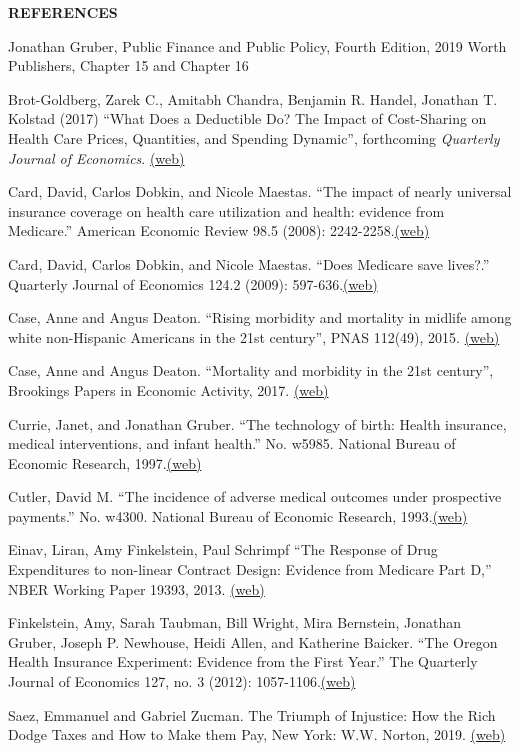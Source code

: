 \documentclass[landscape]{slides}
\begin{document}
\begin{slide}
\begin{center}
{\bf REFERENCES}
\end{center}
{\small

Jonathan Gruber, Public Finance and Public Policy, Fourth Edition, 2019 Worth Publishers, Chapter 15 and Chapter 16

Brot-Goldberg, Zarek C.,  Amitabh Chandra, Benjamin R. Handel, Jonathan T. Kolstad (2017) ``What Does a Deductible Do? The Impact of Cost-Sharing on Health Care Prices, Quantities, and Spending Dynamic'', forthcoming \emph{Quarterly Journal of Economics}. \href{http://elsa.berkeley.edu/~saez/course131/brotetalQJE17.pdf}{(web)}

Card, David, Carlos Dobkin, and Nicole Maestas. ``The impact of nearly universal insurance coverage on health care utilization and health: evidence from Medicare.'' American Economic Review 98.5 (2008): 2242-2258.\href{http://elsa.berkeley.edu/~saez/course131/Card-Dobkin-Maestas08.pdf}{(web)}

Card, David, Carlos Dobkin, and Nicole Maestas. ``Does Medicare save lives?.'' Quarterly Journal of Economics 124.2 (2009): 597-636.\href{http://elsa.berkeley.edu/~saez/course131/Card-Dobkin-Maestas09.pdf}{(web)}

Case, Anne and Angus Deaton.  ``Rising morbidity and mortality in midlife among white non-Hispanic Americans in the 21st century'',  PNAS 112(49), 2015. \href{http://www.pnas.org/content/112/49/15078.full.pdf} {(web)}

Case, Anne and Angus Deaton.  ``Mortality and morbidity in the 21st century'',  Brookings Papers in Economic Activity, 2017. \href{http://elsa.berkeley.edu/~saez/course131/casedeatonBrook17.pdf} {(web)}

Currie, Janet, and Jonathan Gruber. ``The technology of birth: Health insurance, medical interventions, and infant health.'' No. w5985. National Bureau of Economic Research, 1997.\href{http://www.nber.org/papers/w5985.pdf}{(web)}

Cutler, David M. ``The incidence of adverse medical outcomes under prospective payments.'' No. w4300. National Bureau of Economic Research, 1993.\href{http://www.nber.org/papers/w4300.pdf}{(web)}

Einav, Liran, Amy Finkelstein, Paul Schrimpf ``The Response of Drug Expenditures to non-linear Contract Design:
Evidence from Medicare Part D,'' NBER Working Paper 19393, 2013.
\href{http://www.nber.org/papers/w19393.pdf}{(web)}

Finkelstein, Amy, Sarah Taubman, Bill Wright, Mira Bernstein, Jonathan Gruber, Joseph P. Newhouse, Heidi Allen, and Katherine Baicker. ``The Oregon Health Insurance Experiment: Evidence from the First Year.'' The Quarterly Journal of Economics 127, no. 3 (2012): 1057-1106.\href{http://elsa.berkeley.edu/~saez/course131/Finkelstein12.pdf}{(web)}

Saez, Emmanuel and Gabriel Zucman. The Triumph of Injustice: How the Rich Dodge Taxes and How to Make them Pay, New York: W.W. Norton, 2019. 
\href{http://www.taxjusticenow.org} {(web)}


}


\end{slide}
\end{document}
